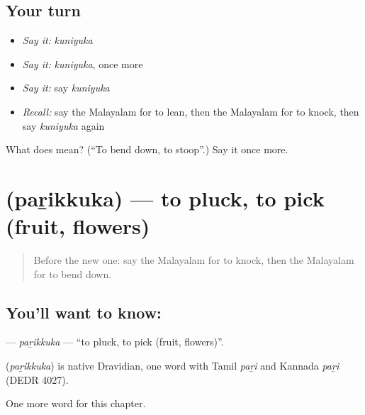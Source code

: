\subsection*{Your turn}
\begin{itemize}
\raggedright
  \item \emph{Say it:} \emph{kuniyuka}
  \item \emph{Say it:} \emph{kuniyuka}, once more
  \item \emph{Say it:} say \emph{kuniyuka}
  \item \emph{Recall:} say the Malayalam for to lean, then the Malayalam for to knock, then say \emph{kuniyuka} again
\end{itemize}

\begin{tcolorbox}[breakable,colback=teal!4,colframe=teal!35!black,title={Before you move on}]
What does  mean? (\textquotedblleft{}To bend down, to stoop\textquotedblright{}.) Say it once more.
\end{tcolorbox}
\section[\texorpdfstring{\ml{പറിക്കുക} (paṟikkuka)}{പറിക്കുക (paṟikkuka)}]{ (paṟikkuka) — to pluck, to pick (fruit, flowers)}

\label{lesson:ML-C231-parikkuka}



\begin{quote}
Before the new one: say the Malayalam for to knock, then the Malayalam for to bend down.
\end{quote}

\subsection*{You'll want to know: }
\textbf{} — \emph{paṟikkuka} — \textquotedblleft{}to pluck, to pick (fruit, flowers)\textquotedblright{}.

\begin{cousinweb}
\textbf{} (\emph{paṟikkuka}) is native Dravidian, one word with Tamil \emph{paṟi} and Kannada \emph{paṟi} (DEDR 4027).
\end{cousinweb}

\begin{grammarlens}[title={What you've built}]
One more word for this chapter.
\end{grammarlens}

